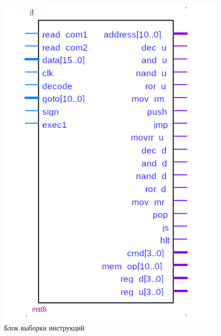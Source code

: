 \begin{figure}[ht]{\textwidth}
\centering
    \includegraphics[scale=0.8]{ifc}
    \caption{Блок выборки инструкций}
\end{figure}

